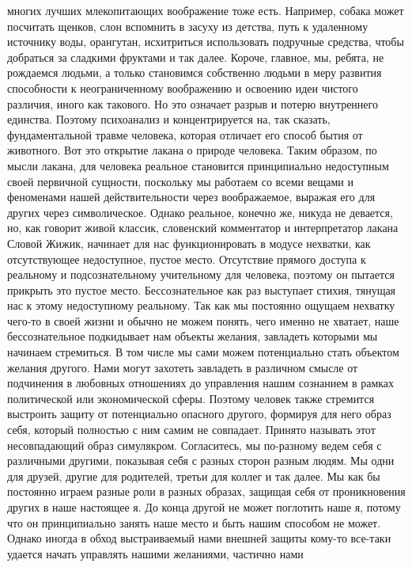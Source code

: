 многих лучших млекопитающих воображение тоже есть. Например, собака может
посчитать щенков, слон вспомнить в засуху из детства, путь к удаленному
источнику воды, орангутан, исхитриться использовать подручные средства, чтобы
добраться за сладкими фруктами и так далее. Короче, главное, мы, ребята, не
рождаемся людьми, а только становимся собственно людьми в меру развития
способности к неограниченному воображению и освоению идеи чистого различия,
иного как такового. Но это означает разрыв и потерю внутреннего единства.
Поэтому психоанализ и концентрируется на, так сказать, фундаментальной травме
человека, которая отличает его способ бытия от животного. Вот это открытие
лакана о природе человека. Таким образом, по мысли лакана, для человека реальное
становится принципиально недоступным своей первичной сущности, поскольку мы
работаем со всеми вещами и феноменами нашей действительности через воображаемое,
выражая его для других через символическое. Однако реальное, конечно же, никуда
не девается, но, как говорит живой классик, словенский комментатор и
интерпретатор лакана Словой Жижик, начинает для нас функционировать в модусе
нехватки, как отсутствующее недоступное, пустое место. Отсутствие прямого
доступа к реальному и подсознательному учительному для человека, поэтому он
пытается прикрыть это пустое место. Бессознательное как раз выступает стихия,
тянущая нас к этому недоступному реальному. Так как мы постоянно ощущаем
нехватку чего-то в своей жизни и обычно не можем понять, чего именно не хватает,
наше бессознательное подкидывает нам объекты желания, завладеть которыми мы
начинаем стремиться. В том числе мы сами можем потенциально стать объектом
желания другого. Нами могут захотеть завладеть в различном смысле от подчинения
в любовных отношениях до управления нашим сознанием в рамках политической или
экономической сферы. Поэтому человек также стремится выстроить защиту от
потенциально опасного другого, формируя для него образ себя, который полностью с
ним самим не совпадает. Принято называть этот несовпадающий образ симулякром.
Согласитесь, мы по-разному ведем себя с различными другими, показывая себя с
разных сторон разным людям. Мы одни для друзей, другие для родителей, третьи для
коллег и так далее. Мы как бы постоянно играем разные роли в разных образах,
защищая себя от проникновения других в наше настоящее я. До конца другой не
может поглотить наше я, потому что он принципиально занять наше место и быть
нашим способом не может. Однако иногда в обход выстраиваемый нами внешней защиты
кому-то все-таки удается начать управлять нашими желаниями, частично нами
